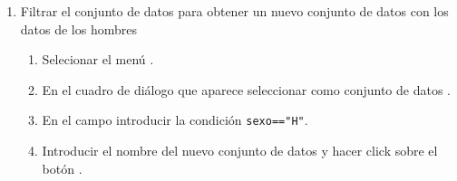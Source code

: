 \begin{enumerate}[leftmargin=*]
\begin{enumerate}
\item Filtrar el conjunto de datos para obtener un nuevo conjunto de datos con los datos de los hombres
\begin{indicacion}{
\begin{enumerate}
\item Selecionar el menú .
\item En el cuadro de diálogo que aparece seleccionar como conjunto de datos .
\item En el campo  introducir la condición \lstinline{sexo=="H"}. 
\item Introducir el nombre del  nuevo conjunto de datos  y hacer click sobre el botón .
\end{enumerate}
}
\end{indicacion}


\end{enumerate}
\end{enumerate}
